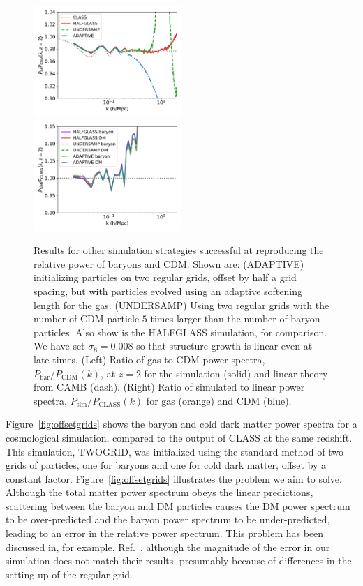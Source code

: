 \documentclass[a4paper,11pt]{article}
\begin{document}
\begin{figure}
\includegraphics[width=0.5\textwidth]{plots/oversample_2_relpower.pdf}
  \includegraphics[width=0.5\textwidth]{plots/oversample_2_class.pdf}
\caption{Results for other simulation strategies successful at reproducing the relative power of baryons and CDM. Shown are: (ADAPTIVE) initializing particles on two regular grids, offset by half a grid spacing, but with particles evolved using an adaptive softening length for the gas. (UNDERSAMP) Using two regular grids with the number of CDM particle $5$ times larger than the number of baryon particles. Also show is the HALFGLASS simulation, for comparison. We have set $\sigma_8 = 0.008$ so that structure growth is linear even at late times. (Left) Ratio of gas to CDM power spectra, $P_\mathrm{bar}/P_\mathrm{CDM}(k)$, at $z=2$ for the simulation (solid) and linear theory from CAMB (dash). (Right) Ratio of simulated to linear power spectra, $P_\mathrm{sim}/P_\mathrm{CLASS}(k)$ for gas (orange) and CDM (blue).}
  \label{fig:adaptive}
\end{figure}

Figure~\ref{fig:offsetgrids} shows the baryon and cold dark matter power spectra for a cosmological simulation, compared to the output of CLASS at the same redshift. This simulation, TWOGRID, was initialized using the standard method of two grids of particles, one for baryons and one for cold dark matter, offset by a constant factor. Figure~\ref{fig:offsetgrids} illustrates the problem we aim to solve. Although the total matter power spectrum obeys the linear predictions, scattering between the baryon and DM particles causes the DM power spectrum to be over-predicted and the baryon power spectrum to be under-predicted, leading to an error in the relative power spectrum. This problem has been discussed in, for example, Ref.~\cite{Angulo:2013}, although the magnitude of the error in our simulation does not match their results, presumably because of differences in the setting up of the regular grid.
\end{document}
